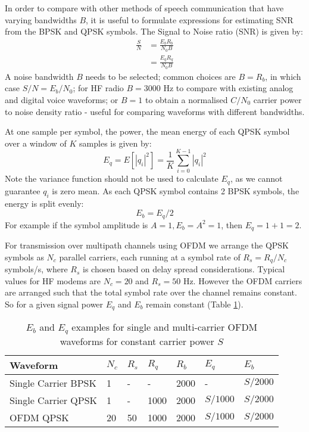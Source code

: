 \documentclass{article}
\begin{document}
In order to compare with other methods of speech communication that have varying bandwidths $B$, it is useful to formulate expressions for estimating SNR from the BPSK and QPSK symbols.  The Signal to Noise ratio (SNR) is given by:
\begin{equation}
\label{eq:snr_theory}
\begin{split}
\frac{S}{N} &= \frac{E_bR_b}{N_0B} \\
            &= \frac{E_qR_q}{N_0B}
\end{split}
\end{equation}
A noise bandwidth $B$ needs to be selected; common choices are $B=R_b$, in which case $S/N=E_b/N_0$; for HF radio $B=3000$ Hz to compare with existing analog and digital voice waveforms; or $B=1$ to obtain a normalised $C/N_0$ carrier power to noise density ratio - useful for comparing waveforms with different bandwidths.
 
At one sample per symbol, the power, the mean energy of each QPSK symbol over a window of $K$ samples is given by:
\begin{equation}
E_q = E[|q_i|^2] = \frac{1}{K}\sum_{i=0}^{K-1}|q_i|^2
\end{equation}
Note the variance function should not be used to calculate $E_q$, as we cannot guarantee $q_i$ is zero mean. As each QPSK symbol contains 2 BPSK symbols, the energy is split evenly:
\begin{equation}
\label{eq:Eb_Es}
E_b = E_q/2
\end{equation}
For example if the symbol amplitude is $A=1, E_b=A^2=1$, then $E_q=1+1=2$.

For transmission over multipath channels using OFDM we arrange the QPSK symbols as $N_c$ parallel carriers, each running at a symbol rate of $R_s=R_q/N_c$ symbols/s, where $R_s$ is chosen based on delay spread considerations.  Typical values for HF modems are $N_c=20$ and $R_s=50$ Hz. However the OFDM carriers are arranged such that the total symbol rate over the channel remains constant.  So for a given signal power $E_q$ and $E_b$ remain constant (Table \ref{tab:constant_eb}).

\begin{table} [H]
\centering
\begin{tabular}{l l l l l l l}
 \hline
 Waveform            & $N_c$ & $R_s$ & $R_q$ & $R_b$ & $E_q$ & $E_b$ \\
 \hline
 Single Carrier BPSK & 1     & -  & -    & 2000  & -        & $S/2000$ \\
 Single Carrier QPSK & 1     & -  & 1000 & 2000  & $S/1000$ & $S/2000$ \\
 OFDM QPSK           & 20    & 50 & 1000 & 2000  & $S/1000$ & $S/2000$ \\
 \hline
\end{tabular}
\caption{$E_b$ and $E_q$ examples for single and multi-carrier OFDM waveforms for constant carrier power $S$}
\label{tab:constant_eb}
\end{table}
\end{document}
